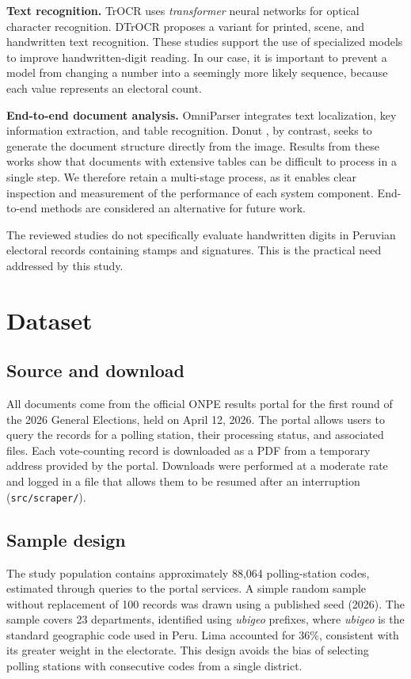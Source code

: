 \documentclass[conference]{IEEEtran}
\begin{document}
\textbf{Text recognition.} TrOCR \cite{trocr} uses \emph{transformer} neural
networks for optical character recognition. DTrOCR \cite{dtrocr} proposes a
variant for printed, scene, and handwritten text recognition. These studies
support the use of specialized models to improve handwritten-digit reading. In
our case, it is important to prevent a model from changing a number into a
seemingly more likely sequence, because each value represents an electoral count.

\textbf{End-to-end document analysis.} OmniParser \cite{omniparser} integrates
text localization, key information extraction, and table recognition. Donut
\cite{donut}, by contrast, seeks to generate the document structure directly
from the image. Results from these works show that documents with extensive
tables can be difficult to process in a single step. We therefore retain a
multi-stage process, as it enables clear inspection and measurement of the
performance of each system component. End-to-end methods are considered an
alternative for future work.

The reviewed studies do not specifically evaluate handwritten digits in Peruvian
electoral records containing stamps and signatures. This is the practical need
addressed by this study.

\section{Dataset}
\subsection{Source and download}
All documents come from the official ONPE results portal for the first round of
the 2026 General Elections, held on April 12, 2026. The portal allows users to
query the records for a polling station, their processing status, and associated
files. Each vote-counting record is downloaded as a PDF from a temporary address
provided by the portal. Downloads were performed at a moderate rate and logged
in a file that allows them to be resumed after an interruption
(\texttt{src/scraper/}).

\subsection{Sample design}
The study population contains approximately 88,064 polling-station codes,
estimated through queries to the portal services. A simple random sample without
replacement of 100 records was drawn using a published seed (2026). The sample
covers 23 departments, identified using \emph{ubigeo} prefixes, where \emph{ubigeo}
is the standard geographic code used in Peru. Lima accounted for 36\%, consistent
with its greater weight in the electorate. This design avoids the bias of
selecting polling stations with consecutive codes from a single district.
\end{document}

